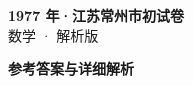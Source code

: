 \documentclass[zihao=-4, a4paper]{ctexart}
\begin{document}
\begin{center}
  {\Large\bfseries 1977 年·江苏常州市初试卷}\\[4pt]
  {\large 数学 · 解析版}
\end{center}
\medskip
{}

\clearpage
{}
\begin{center}{\Large\bfseries 参考答案与详细解析}\end{center}
\medskip

\end{document}
